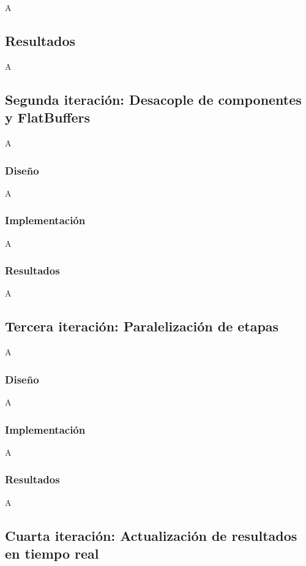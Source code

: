 A

\subsection{Resultados}

A

\subsection{Segunda iteración: Desacople de componentes y FlatBuffers}

A

\subsubsection{Diseño}

A

\subsubsection{Implementación}

A

\subsubsection{Resultados}

A

\subsection{Tercera iteración: Paralelización de etapas}

A

\subsubsection{Diseño}

A

\subsubsection{Implementación}

A

\subsubsection{Resultados}

A

\subsection{Cuarta iteración: Actualización de resultados en tiempo real}

